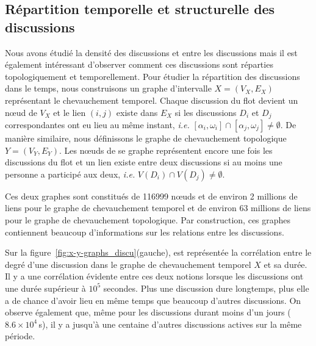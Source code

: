 \subsection{Répartition temporelle et structurelle des discussions}

Nous avons étudié la densité des discussions et entre les discussions mais il est également intéressant d'observer comment ces discussions sont réparties topologiquement et temporellement.
Pour étudier la répartition des discussions dans le temps, nous construisons un graphe d'intervalle \REF $X=(V_X,E_X)$ représentant le chevauchement temporel.
Chaque discussion du flot devient un n\oe ud de $V_X$ et le lien $(i,j)$ existe dans $E_X$ si les discussions $D_i$ et $D_j$ correspondantes ont eu lieu au même instant, \emph{i.e.} $[\alpha_i, \omega_i] \cap [\alpha_j, \omega_j] \neq \emptyset$.
De manière similaire, nous définissons le graphe de chevauchement topologique $Y=(V_Y,E_Y)$.
Les n\oe uds de se graphe représentent encore une fois les discussions du flot et un lien existe entre deux discussions si au moins une personne a participé aux deux, \emph{i.e.} $V(D_i) \cap V(D_j) \neq \emptyset$.

Ces deux graphes sont constitués de 116999 n\oe uds et de environ 2 millions de liens pour le graphe de chevauchement temporel et de environ 63 millions de liens pour le graphe de chevauchement topologique.
Par construction, ces graphes contiennent beaucoup d'informations sur les relations entre les discussions.


Sur la figure~\ref{fig:x-y-graphs_discu}(gauche), est représentée la corrélation entre le degré d'une discussion dans le graphe de chevauchement temporel $X$ et sa durée.
Il y a une corrélation évidente entre ces deux notions lorsque les discussions ont une durée supérieur à $10^5$ secondes.
Plus une discussion dure longtemps, plus elle a de chance d'avoir lieu en même temps que beaucoup d'autres discussions.
On observe également que, même pour les discussions durant moins d'un jours ($8.6 \times 10^4$\,s), il y a jusqu'à une centaine d'autres discussions actives sur la même période.

